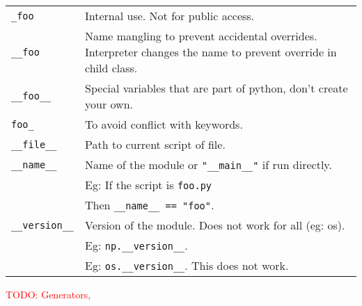 \begin{tabularx}{\linewidth}{lX}
\texttt{\_foo}                  & Internal use. Not for public access.\\
\texttt{\_\_foo}                & Name mangling to prevent accidental overrides. Interpreter changes
                                    the name to prevent override in child class.\\
\texttt{\_\_foo\_\_}            & Special variables that are part of python, don't create your own.\\
\texttt{foo\_}                  & To avoid conflict with keywords.\\
\hline
\texttt{\_\_file\_\_}           & Path to current script of file.\\
\texttt{\_\_name\_\_}           & Name of the module or \texttt{"\_\_main\_\_"} if run directly.\\
                                & Eg: If the script is \texttt{foo.py}\\
                                & Then \texttt{\_\_name\_\_ == "foo"}.\\
\texttt{\_\_version\_\_}        & Version of the module. Does not work for all (eg: os).\\
                                & Eg: \texttt{np.\_\_version\_\_}.\\
                                & Eg: \texttt{os.\_\_version\_\_}. This does not work.\\
\hline
\end{tabularx}



\textcolor{red}{TODO: Generators, }

\columnbreak